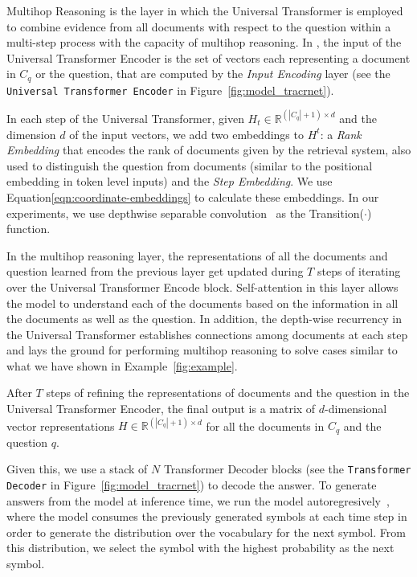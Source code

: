 Multihop Reasoning is the layer in which the Universal Transformer is employed to combine evidence from all documents with respect to the question within a multi-step process with the capacity of multihop reasoning.
%
In \tracrnet, the input of the Universal Transformer Encoder is the set of vectors each representing a document in $C_q$ or the question, that are computed by the \emph{Input Encoding} layer  (see  the \texttt{Universal Transformer Encoder} in Figure~\ref{fig:model_tracrnet}). 

In each step of the Universal Transformer, given $H_{t} \in \mathbb{R}^{(|C_q|+1) \times d}$ and the dimension $d$ of the input vectors, we add two embeddings to $H^{t}$: a \emph{Rank Embedding} that encodes the rank of documents given by the retrieval system, also used to distinguish the question from documents (similar to the positional embedding in token level inputs) and the \emph{Step Embedding}. We use Equation\ref{eqn:coordinate-embeddings} to calculate these embeddings.
In our experiments, we use depthwise separable convolution~\cite{chollet2017xception} as the Transition($\cdot$) function.

In the multihop reasoning layer, the representations of all the documents and question learned from the previous layer get updated during $T$ steps of iterating over the Universal Transformer Encode block. 
Self-attention in this layer allows the model to understand each of the documents based on the information in all the documents as well as the question.
In addition, the depth-wise recurrency in the Universal Transformer establishes connections among documents at each step and lays the ground for performing multihop reasoning to solve cases similar to what we have shown in Example~\ref{fig:example}.

After $T$ steps of refining the representations of documents and the question in the Universal Transformer Encoder, the final output is a matrix of $d$-dimensional vector representations $H \in \mathbb{R}^{(|C_q|+1) \times d}$ for all the documents in $C_q$ and the question $q$.

Given this, we use a stack of $N$ Transformer Decoder blocks (see  the \texttt{Transformer Decoder} in Figure~\ref{fig:model_tracrnet}) to decode the answer.
To generate answers from the model at inference time, we run the model autoregresively~\citep{graves2013generating}, where the model consumes the previously generated symbols at each time step in order to generate the distribution over the vocabulary for the next symbol. From this distribution, we select the symbol with the highest probability as the next symbol.   


